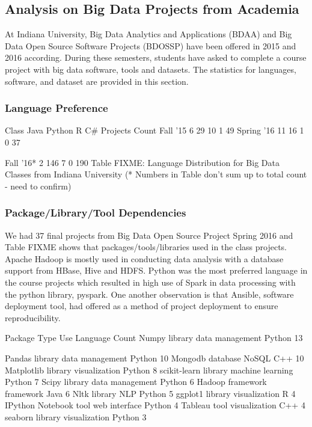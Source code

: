 \documentclass[9pt,twocolumn,twoside]{styles/osajnl}
\begin{document}
\subsection{Analysis on Big Data Projects from Academia}

At Indiana University, Big Data Analytics and Applications (BDAA) and Big Data Open Source Software Projects (BDOSSP) have been offered in 2015 and 2016 according. During these semesters, students have asked to complete a course project with big data software, tools and datasets. The statistics for languages, software, and dataset are provided in this section.
\subsubsection{Language Preference}

Class
	Java
	Python
	R
	C\#
	Projects Count
	Fall ’15
	6
	29
	10
	1
	49
	Spring ’16
	11
	16
	1
	0
	37

	Fall ’16*
	2
	146
	7
	0
	190
	Table  FIXME:  Language Distribution for Big Data Classes from Indiana University
(* Numbers in Table don’t sum up to total count - need to confirm)
\subsubsection{Package/Library/Tool Dependencies}

We had 37 final projects from Big Data Open Source Project Spring 2016
and Table FIXME shows that packages/tools/libraries used in the class
projects. Apache Hadoop is mostly used in conducting data analysis
with a database support from HBase, Hive and HDFS. Python was the most
preferred language in the course projects which resulted in high use
of Spark in data processing with the python library, pyspark. One
another observation is that Ansible, software deployment tool, had
offered as a method of project deployment to ensure reproducibility.





Package
	Type
	Use
	Language
	Count
	Numpy
	library
	data management
	Python
	13

	Pandas
	library
	data management
	Python
	10
	Mongodb
	database
	NoSQL
	C++
	10
	Matplotlib
	library
	visualization
	Python
	8
	scikit-learn
	library
	machine learning
	Python
	7
	Scipy
	library
	data management
	Python
	6
	Hadoop
	framework
	framework
	Java
	6
	Nltk
	library
	NLP
	Python
	5
	ggplot1
	library
	visualization
	R
	4
	IPython Notebook
	tool
	web interface
	Python
	4
	Tableau
	tool
	visualization
	C++
	4
	seaborn
	library
	visualization
	Python
	3
\end{document}
